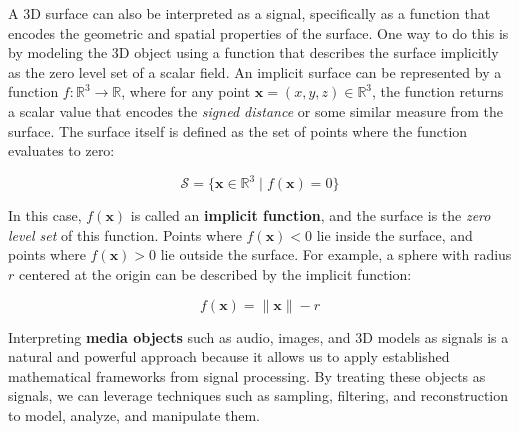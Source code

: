 A 3D surface can also be interpreted as a signal, specifically as a function that encodes the geometric and spatial properties of the surface. One way to do this is by modeling the 3D object using a function that describes the surface implicitly as the zero level set of a scalar field. An implicit surface can be represented by a function \( f : \mathbb{R}^3 \rightarrow \mathbb{R} \), where for any point \( \mathbf{x} = (x, y, z) \in \mathbb{R}^3 \), the function returns a scalar value that encodes the \textit{signed distance} or some similar measure from the surface. The surface itself is defined as the set of points where the function evaluates to zero:

\[
\mathcal{S} = \{ \mathbf{x} \in \mathbb{R}^3 \mid f(\mathbf{x}) = 0 \}
\]

In this case, \( f(\mathbf{x}) \) is called an \textbf{implicit function}, and the surface is the \textit{zero level set} of this function. Points where \( f(\mathbf{x}) < 0 \) lie inside the surface, and points where \( f(\mathbf{x}) > 0 \) lie outside the surface. For example, a sphere with radius \( r \) centered at the origin can be described by the implicit function:

\[
f(\mathbf{x}) = \|\mathbf{x}\| - r
\]

Interpreting \textbf{media objects} such as audio, images, and 3D models as signals is a natural and powerful approach because it allows us to apply established mathematical frameworks from signal processing. By treating these objects as signals, we can leverage techniques such as sampling, filtering, and reconstruction to model, analyze, and manipulate them.




